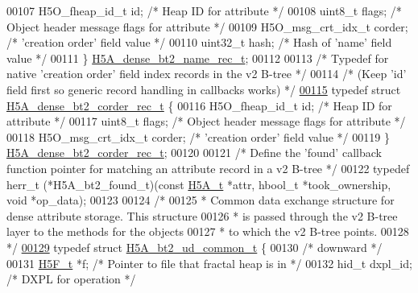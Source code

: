 \begin{DoxyCode}
00107     H5O\_fheap\_id\_t id;                  \textcolor{comment}{/* Heap ID for attribute */}
00108     uint8\_t flags;                      \textcolor{comment}{/* Object header message flags for attribute */}
00109     H5O\_msg\_crt\_idx\_t corder;           \textcolor{comment}{/* 'creation order' field value */}
00110     uint32\_t hash;                      \textcolor{comment}{/* Hash of 'name' field value */}
00111 \} \hyperlink{struct_h5_a__dense__bt2__name__rec__t}{H5A\_dense\_bt2\_name\_rec\_t};
00112 
00113 \textcolor{comment}{/* Typedef for native 'creation order' field index records in the v2 B-tree */}
00114 \textcolor{comment}{/* (Keep 'id' field first so generic record handling in callbacks works) */}
\hyperlink{struct_h5_a__dense__bt2__corder__rec__t}{00115} \textcolor{keyword}{typedef} \textcolor{keyword}{struct }\hyperlink{struct_h5_a__dense__bt2__corder__rec__t}{H5A\_dense\_bt2\_corder\_rec\_t} \{
00116     H5O\_fheap\_id\_t id;                  \textcolor{comment}{/* Heap ID for attribute */}
00117     uint8\_t flags;                      \textcolor{comment}{/* Object header message flags for attribute */}
00118     H5O\_msg\_crt\_idx\_t corder;           \textcolor{comment}{/* 'creation order' field value */}
00119 \} \hyperlink{struct_h5_a__dense__bt2__corder__rec__t}{H5A\_dense\_bt2\_corder\_rec\_t};
00120 
00121 \textcolor{comment}{/* Define the 'found' callback function pointer for matching an attribute record in a v2 B-tree */}
00122 \textcolor{keyword}{typedef} herr\_t (*H5A\_bt2\_found\_t)(\textcolor{keyword}{const} \hyperlink{struct_h5_a__t}{H5A\_t} *attr, hbool\_t *took\_ownership, \textcolor{keywordtype}{void} *op\_data);
00123 
00124 \textcolor{comment}{/*}
00125 \textcolor{comment}{ * Common data exchange structure for dense attribute storage.  This structure}
00126 \textcolor{comment}{ * is passed through the v2 B-tree layer to the methods for the objects}
00127 \textcolor{comment}{ * to which the v2 B-tree points.}
00128 \textcolor{comment}{ */}
\hyperlink{struct_h5_a__bt2__ud__common__t}{00129} \textcolor{keyword}{typedef} \textcolor{keyword}{struct }\hyperlink{struct_h5_a__bt2__ud__common__t}{H5A\_bt2\_ud\_common\_t} \{
00130     \textcolor{comment}{/* downward */}
00131     \hyperlink{struct_h5_f__t}{H5F\_t}       *f;                     \textcolor{comment}{/* Pointer to file that fractal heap is in */}
00132     hid\_t       dxpl\_id;                \textcolor{comment}{/* DXPL for operation                */}

\end{DoxyCode}
